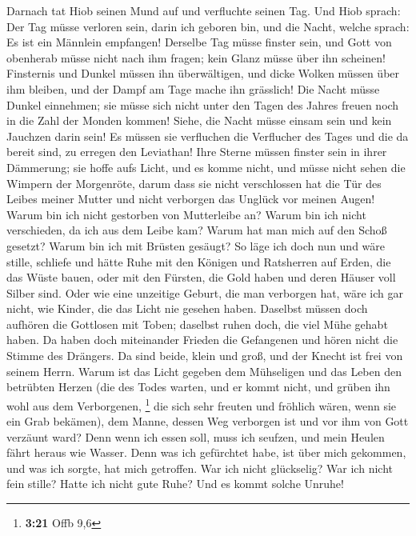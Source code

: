  Darnach tat Hiob seinen Mund auf und verfluchte seinen
Tag.  Und Hiob sprach:  Der Tag müsse
verloren sein, darin ich geboren bin, und die Nacht, welche sprach: Es
ist ein Männlein empfangen!  Derselbe Tag müsse finster
sein, und Gott von obenherab müsse nicht nach ihm fragen; kein Glanz
müsse über ihn scheinen!  Finsternis und Dunkel müssen ihn
überwältigen, und dicke Wolken müssen über ihm bleiben, und der Dampf am
Tage mache ihn grässlich!  Die Nacht müsse Dunkel
einnehmen; sie müsse sich nicht unter den Tagen des Jahres freuen noch
in die Zahl der Monden kommen!  Siehe, die Nacht müsse
einsam sein und kein Jauchzen darin sein!  Es müssen sie
verfluchen die Verflucher des Tages und die da bereit sind, zu erregen
den Leviathan!  Ihre Sterne müssen finster sein in ihrer
Dämmerung; sie hoffe aufs Licht, und es komme nicht, und müsse nicht
sehen die Wimpern der Morgenröte,  darum dass sie nicht
verschlossen hat die Tür des Leibes meiner Mutter und nicht verborgen
das Unglück vor meinen Augen!  Warum bin ich nicht
gestorben von Mutterleibe an? Warum bin ich nicht verschieden, da ich
aus dem Leibe kam?  Warum hat man mich auf den Schoß
gesetzt? Warum bin ich mit Brüsten gesäugt?  So läge ich
doch nun und wäre stille, schliefe und hätte Ruhe  mit
den Königen und Ratsherren auf Erden, die das Wüste bauen,
 oder mit den Fürsten, die Gold haben und deren Häuser
voll Silber sind.  Oder wie eine unzeitige Geburt, die
man verborgen hat, wäre ich gar nicht, wie Kinder, die das Licht nie
gesehen haben.  Daselbst müssen doch aufhören die
Gottlosen mit Toben; daselbst ruhen doch, die viel Mühe gehabt haben.
 Da haben doch miteinander Frieden die Gefangenen und
hören nicht die Stimme des Drängers.  Da sind beide,
klein und groß, und der Knecht ist frei von seinem Herrn.
 Warum ist das Licht gegeben dem Mühseligen und das Leben
den betrübten Herzen  (die des Todes warten, und er kommt
nicht, und grüben ihn wohl aus dem Verborgenen, \footnote{\textbf{3:21}
  Offb 9,6}  die sich sehr freuten und fröhlich wären,
wenn sie ein Grab bekämen),  dem Manne, dessen Weg
verborgen ist und vor ihm von Gott verzäunt ward?  Denn
wenn ich essen soll, muss ich seufzen, und mein Heulen fährt heraus wie
Wasser.  Denn was ich gefürchtet habe, ist über mich
gekommen, und was ich sorgte, hat mich getroffen.  War
ich nicht glückselig? War ich nicht fein stille? Hatte ich nicht gute
Ruhe? Und es kommt solche Unruhe!

